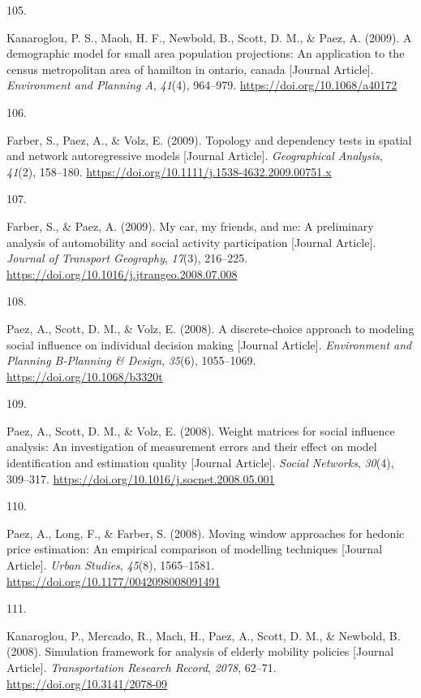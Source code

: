\documentclass[11pt,a4paper,]{awesome-cv}
\newlength{\csllabelwidth}
\newcommand{\CSLLeftMargin}[1]{\parbox[t]{\csllabelwidth}{#1}}
\newcommand{\CSLRightInline}[1]{\parbox[t]{\linewidth - \csllabelwidth}{#1}}
\begin{document}
\leavevmode{}%
\CSLLeftMargin{105. }
\CSLRightInline{Kanaroglou, P. S., Maoh, H. F., Newbold, B., Scott, D.
M., \& Paez, A. (2009). A demographic model for small area population
projections: An application to the census metropolitan area of hamilton
in ontario, canada {[}Journal Article{]}. \emph{Environment and Planning
A}, \emph{41}(4), 964--979. \url{https://doi.org/10.1068/a40172}}

\leavevmode{}%
\CSLLeftMargin{106. }
\CSLRightInline{Farber, S., Paez, A., \& Volz, E. (2009). Topology and
dependency tests in spatial and network autoregressive models {[}Journal
Article{]}. \emph{Geographical Analysis}, \emph{41}(2), 158--180.
\url{https://doi.org/10.1111/j.1538-4632.2009.00751.x}}

\leavevmode{}%
\CSLLeftMargin{107. }
\CSLRightInline{Farber, S., \& Paez, A. (2009). My car, my friends, and
me: A preliminary analysis of automobility and social activity
participation {[}Journal Article{]}. \emph{Journal of Transport
Geography}, \emph{17}(3), 216--225.
\url{https://doi.org/10.1016/j.jtrangeo.2008.07.008}}

\leavevmode{}%
\CSLLeftMargin{108. }
\CSLRightInline{Paez, A., Scott, D. M., \& Volz, E. (2008). A
discrete-choice approach to modeling social influence on individual
decision making {[}Journal Article{]}. \emph{Environment and Planning
B-Planning \& Design}, \emph{35}(6), 1055--1069.
\url{https://doi.org/10.1068/b3320t}}

\leavevmode{}%
\CSLLeftMargin{109. }
\CSLRightInline{Paez, A., Scott, D. M., \& Volz, E. (2008). Weight
matrices for social influence analysis: An investigation of measurement
errors and their effect on model identification and estimation quality
{[}Journal Article{]}. \emph{Social Networks}, \emph{30}(4), 309--317.
\url{https://doi.org/10.1016/j.socnet.2008.05.001}}

\leavevmode{}%
\CSLLeftMargin{110. }
\CSLRightInline{Paez, A., Long, F., \& Farber, S. (2008). Moving window
approaches for hedonic price estimation: An empirical comparison of
modelling techniques {[}Journal Article{]}. \emph{Urban Studies},
\emph{45}(8), 1565--1581.
\url{https://doi.org/10.1177/0042098008091491}}

\leavevmode{}%
\CSLLeftMargin{111. }
\CSLRightInline{Kanaroglou, P., Mercado, R., Mach, H., Paez, A., Scott,
D. M., \& Newbold, B. (2008). Simulation framework for analysis of
elderly mobility policies {[}Journal Article{]}. \emph{Transportation
Research Record}, \emph{2078}, 62--71.
\url{https://doi.org/10.3141/2078-09}}
\end{document}
